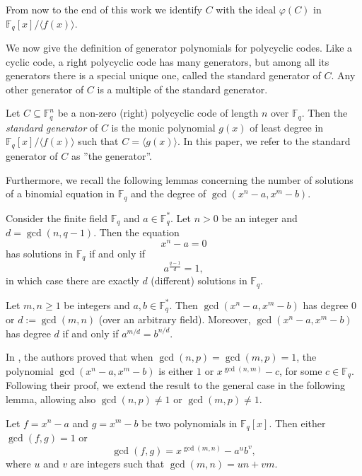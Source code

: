 \documentclass[12pt]{elsarticle}
\newcommand{\Fq}{\mathbb{F}_{q}}
\theoremstyle{break}
{\theorembodyfont{\upshape}
    \newtheorem{theorem}{Theorem}[section] %
    \newtheorem{lemma}[theorem]{Lemma} %
    \newtheorem{proposition}[theorem]{Proposition}
    \newtheorem{corollary}[theorem]{Corollary}
    \newtheorem{definition}[theorem]{Definition}
    \newtheorem{example}[theorem]{Example}
    \newtheorem{remark}[theorem]{Remark}
    \newtheorem{conjecture}[theorem]{Conjecture}
    \newtheorem*{proof}{{Proof}}
	\newtheorem*{notation}{Notation}
	\newtheorem*{main}{Cain Theorem}
	\newtheorem*{problem}{Problem}
}
\begin{document}
\begin{remark}
    From now to the end of this work we identify $C$ with the ideal  $\varphi(C)$ in $ \Fq[x]/\langle f(x)\rangle.$ 
 \end{remark}   
    We now give the definition of generator polynomials for polycyclic codes. Like a cyclic code, a right polycyclic code has many generators, but among all its generators there is a special unique one, called the standard generator of $C$. Any other generator of $C$ is a multiple of the standard generator. 
    \begin{definition}
    Let $C \subseteq \Fq^{n}$ be a non-zero (right) polycyclic code of length $n$ over $\Fq$. Then the \textit{standard generator} of $C$ is the monic polynomial $g(x)$ of least degree in $ \Fq[x]/\langle f(x) \rangle $ such that $C=\langle g(x) \rangle $.  In this paper, we refer to the standard generator of $C$ as ''the generator''. 
    \end{definition}
    		

Furthermore, we recall the following lemmas concerning the number of solutions of a binomial equation in $\mathbb{F}_q$ and the degree of $\gcd\left(x^n - a, x^m - b\right)$.

\begin{lemma}\cite[Lemma 1]{Schwarz1949}\label{L_soltion}
Consider the finite field $\Fq$ and $ a \in \Fq^*$. Let $n>0$ be an integer and $d=\gcd(n, q-1)$. Then the equation
$$ x^n-a=0$$
has solutions in $\Fq$  if and only if 
$$a^{\frac{q-1}{d}}=1 ,
$$
in which case  there are exactly  $d$ (different) solutions in $\Fq.$
\end{lemma}

\begin{lemma}\cite[Lemma 1]{Redei1950} \label{L_Binomial}
Let $m, n \geq 1$ be integers and $a, b \in \mathbb{F}_q^*$. Then $\gcd\left(x^n-a, x^m-b\right)$ has degree 0 or $d:=\gcd(m, n)$ (over an arbitrary field). Moreover, $\gcd\left(x^n-a, x^m-b\right)$ has degree $d$ if and only if $a^{m / d}=b^{n / d}$.
\end{lemma}

In \cite[Theorem 4.1]{Aydin2017}, the authors proved that when $\gcd(n, p) = \gcd(m, p) = 1$, the polynomial $\gcd(x^n - a, x^m - b)$ is either $1$ or $x^{\gcd(n, m)} - c$, for some $c \in \mathbb{F}_q$. Following their proof, we extend the result to the general case in the following lemma, allowing also $\gcd(n, p) \neq 1$ or $\gcd(m, p) \neq  1.$

\begin{lemma}\label{L.2}
Let $f = x^n - a$ and $g = x^m - b$ be two polynomials in $\mathbb{F}_q[x]$. %
Then either $\gcd(f, g)=1$ or  $$ \gcd(f, g) = x^{\gcd(m,n)} -  a^u b^v ,$$  
where $ u $ and $ v $ are integers such that $ \gcd(m, n) = u n + v m $.
\end{lemma}
\end{document}
